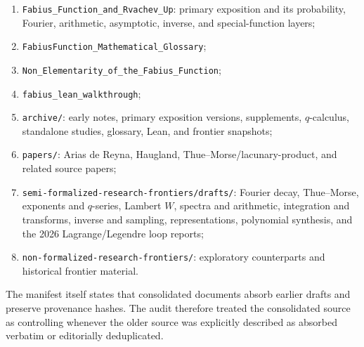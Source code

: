 \documentclass[11pt,oneside]{article}
\theoremstyle{definition}
\theoremstyle{remark}
\begin{document}
\begin{enumerate}
\item \texttt{Fabius\_Function\_and\_Rvachev\_Up}: primary exposition and its
probability, Fourier, arithmetic, asymptotic, inverse, and special-function layers;
\item \texttt{FabiusFunction\_Mathematical\_Glossary};
\item \texttt{Non\_Elementarity\_of\_the\_Fabius\_Function};
\item \texttt{fabius\_lean\_walkthrough};
\item \texttt{archive/}: early notes, primary exposition versions, supplements,
$q$-calculus, standalone studies, glossary, Lean, and frontier snapshots;
\item \texttt{papers/}: Arias de Reyna, Haugland, Thue--Morse/lacunary-product,
and related source papers;
\item \texttt{semi-formalized-research-frontiers/drafts/}: Fourier decay,
Thue--Morse, exponents and $q$-series, Lambert $W$, spectra and arithmetic,
integration and transforms, inverse and sampling, representations, polynomial
synthesis, and the 2026 Lagrange/Legendre loop reports;
\item \texttt{non-formalized-research-frontiers/}: exploratory counterparts and
historical frontier material.
\end{enumerate}

The manifest itself states that consolidated documents absorb earlier drafts and
preserve provenance hashes.  The audit therefore treated the consolidated source
as controlling whenever the older source was explicitly described as absorbed
verbatim or editorially deduplicated.
\end{document}
